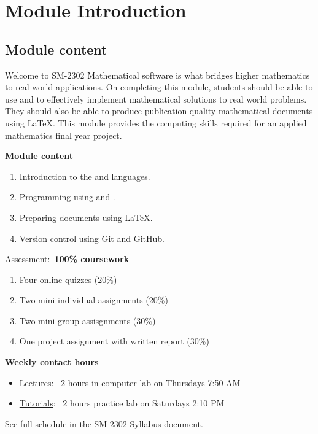 \section{Module Introduction}


\subsection{Module content}
\begin{frame}{Welcome to SM-2302}
Mathematical software is what bridges higher mathematics to real world applications. 
On completing this module, students should be able to use  and  to effectively 
implement mathematical solutions to real world problems. 
They should also be able to produce publication-quality mathematical documents using \LaTeX. 
This module provides the computing skills required for an applied mathematics final year project.

\par\bigskip 
{\bfseries Module content}
\par\smallskip

\begin{enumerate}
	\item Introduction to the  and  languages.
	\item Programming using  and .
	\item Preparing documents using \LaTeX.
	\item Version control using Git and GitHub.
\end{enumerate}
\end{frame}


\begin{frame}
\begin{exampleblock}{Assessment:~\textbf{100\% coursework}}
\begin{enumerate}
	\item Four online quizzes (20\%)
	\item Two mini individual assignments (20\%)
	\item Two mini group assisgnments (30\%)
	\item One project assignment with written report (30\%)
\end{enumerate}
\end{exampleblock}

\par\bigskip 
{\bfseries Weekly contact hours}
\par\smallskip
\begin{itemize}
	\item \underline{Lectures}:~ 2 hours in computer lab on Thursdays 7:50 AM
	\item \underline{Tutorials}:~ 2 hours practice lab on Saturdays 2:10 PM
\end{itemize} 
See full schedule in the \href{https://sm2302.github.io/sm2302-syllabus.pdf}{SM-2302 Syllabus document}.
\end{frame}

